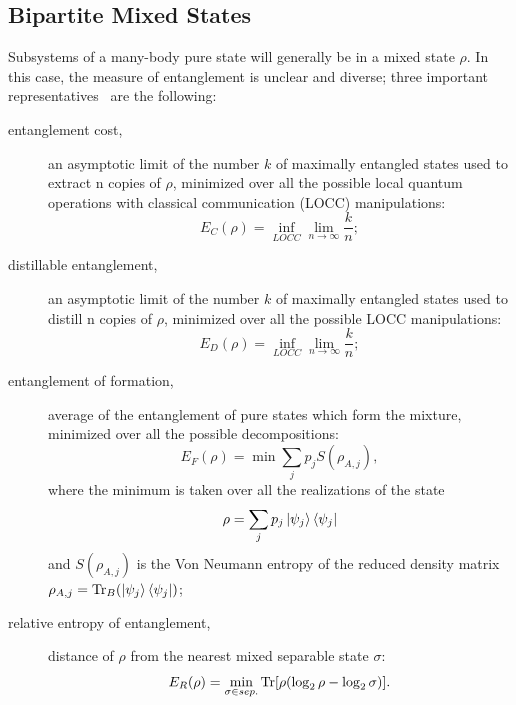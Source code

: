 \subsection{Bipartite Mixed States}
\label{bi_mixed_states}
Subsystems of a many-body pure state will generally be in a mixed state $\rho$. In this case, the measure of entanglement is unclear and diverse; three important representatives~\cite{RevModPhys.80.517, phd_ross} are the following:
\begin{description}
    \item[entanglement cost,] an asymptotic limit of the number $k$ of maximally entangled states used to extract n copies of $\rho$, minimized over all the possible local quantum operations with classical communication (LOCC) manipulations:
    \begin{equation*}
        E_C(\rho) = \inf_{LOCC}\lim_{n\to\infty} \frac{k}{n};
    \end{equation*}
    \item[distillable entanglement,] an asymptotic limit of the number $k$ of maximally entangled states used to distill n copies of $\rho$, minimized over all the possible LOCC manipulations:
    \begin{equation*}
        E_D(\rho) = \inf_{LOCC}\lim_{n\to\infty} \frac{k}{n};
    \end{equation*}
    \item[entanglement of formation,] average of the entanglement of pure states which form the mixture, minimized over all the possible decompositions:
    \begin{equation*}
        E_F(\rho) = \min \sum_j p_j S(\rho_{A,j}),
    \end{equation*}
    where the minimum is taken over all the realizations of the state
    \begin{equation*}
        \rho = \sum_j p_j \ket{\psi_j}\bra{\psi_j}
    \end{equation*}
    and $S(\rho_{A,j})$ is the Von Neumann entropy of the reduced density matrix\\ $\rho_{A,j} = \operatorname{Tr}_B (\ket{\psi_j}\bra{\psi_j})$;
    \item[relative entropy of entanglement,] distance of $\rho$ from the nearest mixed separable state $\sigma$:
    \begin{equation*}
        E_R(\rho) = \min_{\sigma \in sep.} \operatorname{Tr}[\rho(\log_2 \rho -\log_2 \sigma)].
    \end{equation*}
\end{description}

